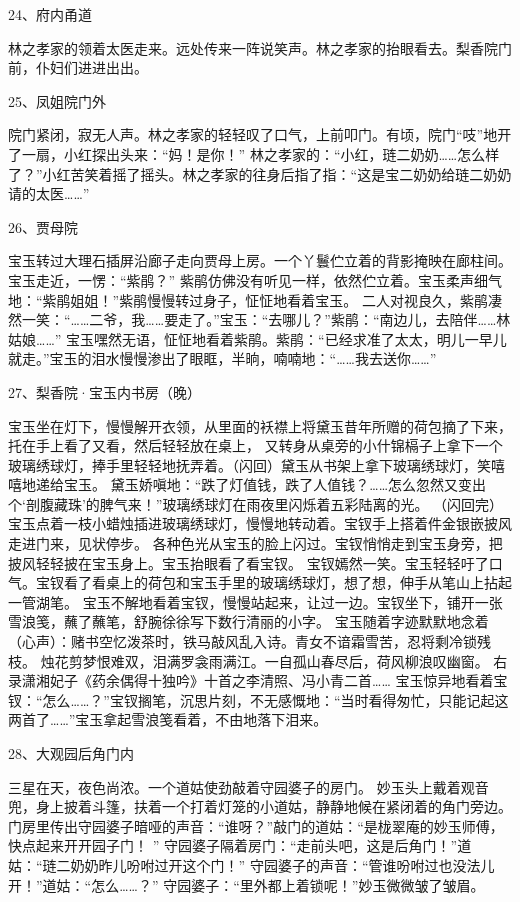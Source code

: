 24、府内甬道\par
林之孝家的领着太医走来。远处传来一阵说笑声。林之孝家的抬眼看去。梨香院门前，仆妇们进进出出。

25、凤姐院门外\par
院门紧闭，寂无人声。林之孝家的轻轻叹了口气，上前叩门。有顷，院门“吱”地开了一扇，小红探出头来：“妈！是你！”
林之孝家的：“小红，琏二奶奶……怎么样了？”小红苦笑着摇了摇头。林之孝家的往身后指了指：“这是宝二奶奶给琏二奶奶请的太医……”

26、贾母院\par
宝玉转过大理石插屏沿廊子走向贾母上房。一个丫鬟伫立着的背影掩映在廊柱间。宝玉走近，一愣：“紫鹃？”
紫鹃仿佛没有听见一样，依然伫立着。宝玉柔声细气地：“紫鹃姐姐！”紫鹃慢慢转过身子，怔怔地看着宝玉。
二人对视良久，紫鹃凄然一笑：“……二爷，我……要走了。”宝玉：“去哪儿？”紫鹃：“南边儿，去陪伴……林姑娘……”
宝玉嘿然无语，怔怔地看着紫鹃。紫鹃：“已经求准了太太，明儿一早儿就走。”宝玉的泪水慢慢渗出了眼眶，半晌，喃喃地：“……我去送你……”

27、梨香院·宝玉内书房（晚）\par
宝玉坐在灯下，慢慢解开衣领，从里面的袄襟上将黛玉昔年所赠的荷包摘了下来，托在手上看了又看，然后轻轻放在桌上，
又转身从桌旁的小什锦槅子上拿下一个玻璃绣球灯，捧手里轻轻地抚弄着。（闪回）黛玉从书架上拿下玻璃绣球灯，笑嘻嘻地递给宝玉。
黛玉娇嗔地：“跌了灯值钱，跌了人值钱？……怎么忽然又变出个‘剖腹藏珠’的脾气来！”玻璃绣球灯在雨夜里闪烁着五彩陆离的光。
（闪回完）宝玉点着一枝小蜡烛插进玻璃绣球灯，慢慢地转动着。宝钗手上搭着件金银嵌披风走进门来，见状停步。
各种色光从宝玉的脸上闪过。宝钗悄悄走到宝玉身旁，把披风轻轻披在宝玉身上。宝玉抬眼看了看宝钗。
宝钗嫣然一笑。宝玉轻轻吁了口气。宝钗看了看桌上的荷包和宝玉手里的玻璃绣球灯，想了想，伸手从笔山上拈起一管湖笔。
宝玉不解地看着宝钗，慢慢站起来，让过一边。宝钗坐下，铺开一张雪浪笺，蘸了蘸笔，舒腕徐徐写下数行清丽的小字。
宝玉随着字迹默默地念着（心声）：赌书空忆泼茶时，铁马敲风乱入诗。青女不谙霜雪苦，忍将剩冷锁残枝。
烛花剪梦恨难双，泪满罗衾雨满江。一自孤山春尽后，荷风柳浪叹幽窗。
右录潇湘妃子《药余偶得十独吟》十首之李清照、冯小青二首……
宝玉惊异地看着宝钗：“怎么……？”宝钗搁笔，沉思片刻，不无感慨地：“当时看得匆忙，只能记起这两首了……”宝玉拿起雪浪笺看着，不由地落下泪来。

28、大观园后角门内\par
三星在天，夜色尚浓。一个道姑使劲敲着守园婆子的房门。
妙玉头上戴着观音兜，身上披着斗篷，扶着一个打着灯笼的小道姑，静静地候在紧闭着的角门旁边。
门房里传出守园婆子暗哑的声音：“谁呀？”敲门的道姑：“是栊翠庵的妙玉师傅，快点起来开开园子门！ ”
守园婆子隔着房门：“走前头吧，这是后角门！”道姑：“琏二奶奶昨儿吩咐过开这个门！”
守园婆子的声音：“管谁吩咐过也没法儿开！”道姑：“怎么……？”
守园婆子：“里外都上着锁呢！”妙玉微微皱了皱眉。

